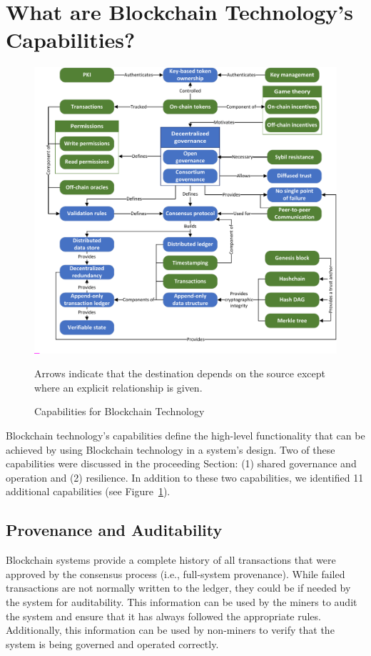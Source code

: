 \section{What are Blockchain Technology's Capabilities?}
\label{sec:capabilities}

\begin{figure}
	\centering
	\includegraphics[page=4,width=\columnwidth]{figures/grounded-theory-main}
	
	Arrows indicate that the destination depends on the source except where an explicit relationship is given.
	\caption{Capabilities for Blockchain Technology}
	\label{fig:Capabilities}
\end{figure}

Blockchain technology's capabilities define the high-level functionality that can be achieved by using Blockchain technology in a system's design.
Two of these capabilities were discussed in the proceeding Section: (1) shared governance and operation and (2) resilience.
In addition to these two capabilities, we identified 11 additional capabilities (see Figure~\ref{fig:Capabilities}).

\subsection{Provenance and Auditability}
Blockchain systems provide a complete history of all transactions that were approved by the consensus process (i.e., full-system provenance).
While failed transactions are not normally written to the ledger, they could be if needed by the system for auditability.
This information can be used by the miners to audit the system and ensure that it has always followed the appropriate rules.
Additionally, this information can be used by non-miners to verify that the system is being governed and operated correctly.

